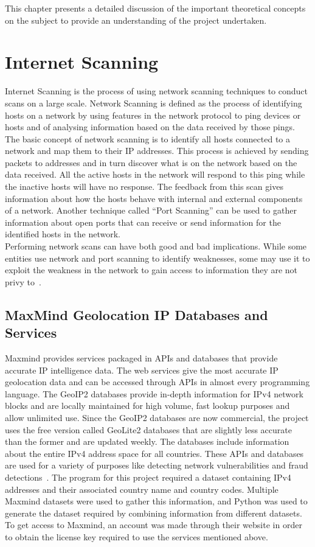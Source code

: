 This chapter presents a detailed discussion of the important theoretical concepts on the subject to provide an understanding of the project 
undertaken. 

\section{Internet Scanning}
Internet Scanning is the process of using network scanning techniques to conduct scans on a large scale. Network Scanning is defined 
as the process of identifying hosts on a network by using features in the network protocol to ping devices or hosts and of analysing 
information based on the data received by those pings. The basic concept of network scanning is to identify all hosts connected to a network and map them
to their IP addresses. This process is achieved by sending packets to addresses and in turn discover what is on the network based on the data received. 
All the active hosts in the network will respond to this ping while the inactive hosts will have no response. The feedback from this scan 
gives information about how the hosts behave with internal and external components of a network. Another technique called ``Port Scanning'' 
can be used to gather information about open ports that can receive or send information for the identified hosts in the network.\\ 
Performing network scans can have both good and bad implications. While some entities use network and port scanning to identify weaknesses, 
some may use it to exploit the weakness in the network to gain access to information they are not privy to~\cite{mou21}. 
\newpage

\subsection{MaxMind Geolocation IP Databases and Services}
Maxmind provides services packaged in APIs and databases that provide accurate IP intelligence data. The web services give the most 
accurate IP geolocation data and can be accessed through APIs in almost every programming language. The GeoIP2 databases provide in-depth information
for IPv4 network blocks and are locally maintained for high volume, fast lookup purposes and allow unlimited use. Since the GeoIP2 databases
are now commercial, the project uses the free version called GeoLite2 databases that are slightly less accurate than the former and are 
updated weekly. The databases include information about the entire IPv4 address space for all countries. These APIs and databases are 
used for a variety of purposes like detecting network vulnerabilities and fraud detections~\cite{GeoLite265:online}. 
The program for this project required a dataset containing IPv4 addresses and their associated country name and country codes. Multiple Maxmind 
datasets were used to gather this information, and Python was used to generate the dataset required by combining information from different datasets. 
To get access to Maxmind, an account was made through their website in order to obtain the license key required to use the services mentioned above. 

